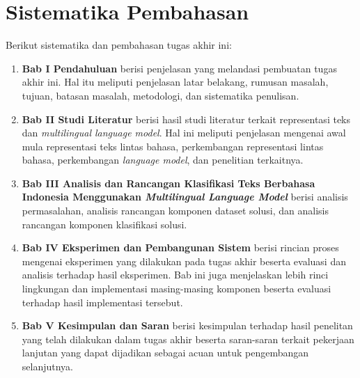 \section{Sistematika Pembahasan}
Berikut sistematika dan pembahasan tugas akhir ini:
\begin{enumerate}
	\item \textbf{Bab I Pendahuluan} berisi penjelasan yang melandasi pembuatan tugas akhir ini. Hal itu meliputi penjelasan latar belakang, rumusan masalah, tujuan, batasan masalah, metodologi, dan sistematika penulisan.
	\item \textbf{Bab II Studi Literatur} berisi hasil studi literatur terkait representasi teks dan \textit{multilingual language model}. Hal ini meliputi penjelasan mengenai awal mula representasi teks lintas bahasa, perkembangan representasi lintas bahasa, perkembangan \textit{language model}, dan penelitian terkaitnya.
	\item \textbf{Bab III Analisis dan Rancangan Klasifikasi Teks Berbahasa Indonesia Menggunakan \textit{Multilingual Language Model}} berisi analisis permasalahan, analisis rancangan komponen dataset solusi, dan analisis rancangan komponen klasifikasi solusi.
	\item \textbf{Bab IV Eksperimen dan Pembangunan Sistem} berisi rincian proses mengenai eksperimen yang dilakukan pada tugas akhir beserta evaluasi dan analisis terhadap hasil eksperimen. Bab ini juga menjelaskan lebih rinci lingkungan dan implementasi masing-masing komponen beserta evaluasi terhadap hasil implementasi tersebut.
	\item \textbf{Bab V Kesimpulan dan Saran} berisi kesimpulan terhadap hasil penelitan yang telah dilakukan dalam tugas akhir beserta saran-saran terkait pekerjaan lanjutan yang dapat dijadikan sebagai acuan untuk pengembangan selanjutnya.
\end{enumerate}





